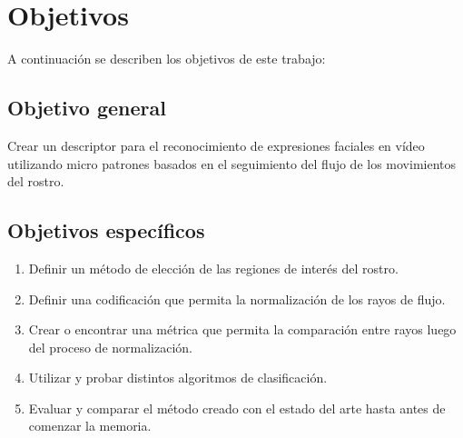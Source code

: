 \section{Objetivos}
\label{subsec:objetivos}
A continuación se describen los objetivos de este trabajo:

\subsection{Objetivo general}
\label{subsubsec:objgeneral}
Crear un descriptor para el reconocimiento de expresiones faciales en vídeo utilizando micro patrones basados en el seguimiento del flujo de los movimientos del rostro.

\subsection{Objetivos específicos}
\label{subsubsec:objgeneral}
	\begin{enumerate}
		\item Definir un método de elección de las regiones de interés del rostro.
		\item Definir una codificación que permita la normalización de los rayos de flujo.
		\item Crear o encontrar una métrica que permita la comparación entre rayos luego del proceso de normalización.
		\item Utilizar y probar distintos algoritmos de clasificación.
		\item Evaluar y comparar el método creado con el estado del arte hasta antes de comenzar la memoria. 
	\end{enumerate}